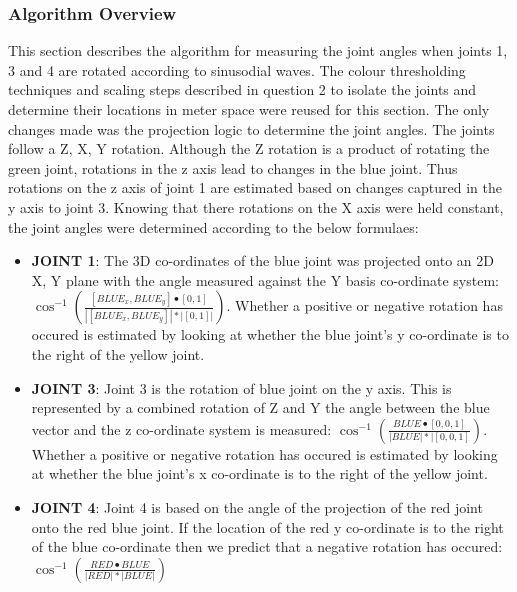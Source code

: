 \documentclass[./writeup.tex]{subfiles}
\begin{document}
\subsubsection{Algorithm Overview}
This section describes the algorithm for measuring the joint angles when joints 1, 3 and 4 are rotated according to sinusodial waves. The colour thresholding techniques and scaling steps described in question 2 to isolate the joints and determine their locations in meter space were reused for this section.
\newline
\newline
The only changes made was the projection logic to determine the joint angles. The joints follow a Z, X, Y rotation. Although the Z rotation is a product of rotating the green joint, rotations in the z axis lead to changes in the blue joint. Thus rotations on the z axis of joint 1 are estimated based on changes captured in the y axis to joint 3. Knowing that there rotations on the X axis were held constant, the joint angles were determined according to the below formulaes:
\begin{itemize}
    \item \textbf{JOINT 1}: The 3D co-ordinates of the blue joint was projected onto an 2D X, Y plane with the angle measured against the Y basis co-ordinate system: $\cos^{-1}(\frac{[BLUE_x, BLUE_y] \bullet [0, 1] }{|[BLUE_x, BLUE_y]| * |[0, 1]|})$. Whether a positive or negative rotation has occured is estimated by looking at whether the blue joint's y co-ordinate is to the right of the yellow joint.
    \item \textbf{JOINT 3}: Joint 3 is the rotation of blue joint on the y axis. This is represented by a combined rotation of Z and Y the angle between the blue vector and the z co-ordinate system is measured: $\cos^{-1}(\frac{BLUE \bullet [0, 0, 1]}{|BLUE| * |[0, 0, 1]})$. Whether a positive or negative rotation has occured is estimated by looking at whether the blue joint's x co-ordinate is to the right of the yellow joint.
    \item \textbf{JOINT 4}: Joint 4 is based on the angle of the projection of the red joint onto the red blue joint. If the location of the red y co-ordinate is to the right of the blue co-ordinate then we predict that a negative rotation has occured: $\cos^{-1}(\frac{RED \bullet BLUE}{|RED|*|BLUE|})$
\end{itemize}
\end{document}
